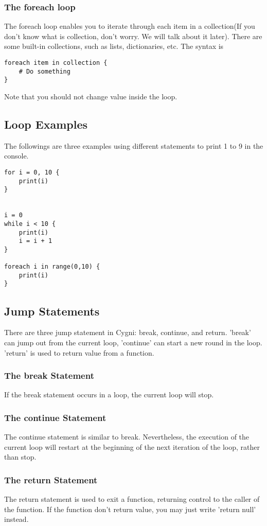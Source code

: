 \subsubsection{The foreach loop}
The foreach loop enables you to iterate through each item in a collection(If you don't know what is collection, don't worry. We will talk about it later). There are some built-in collections, such as lists, dictionaries, etc. The syntax is
\begin{lstlisting}
foreach item in collection {
	# Do something
}
\end{lstlisting}
Note that you should not change value inside the loop.

\subsection{Loop Examples}
The followings are three examples using different statements to print 1 to 9 in the console.
\begin{lstlisting}
for i = 0, 10 {
	print(i)
}


i = 0
while i < 10 {
	print(i)
	i = i + 1
}

foreach i in range(0,10) {
	print(i)
}
\end{lstlisting}


\subsection{Jump Statements}
There are three jump statement in Cygni: break, continue, and return. 'break' can jump out from the current loop, 'continue' can start a new round in the loop. 'return' is used to return value from a function.
\subsubsection{The break Statement}
If the break statement occurs in a loop, the current loop will stop.
\subsubsection{The continue Statement}
The continue statement is similar to break. Nevertheless, the execution of the current loop will restart at the beginning of the next iteration of the loop, rather than stop.
\subsubsection{The return Statement}
The return statement is used to exit a function, returning control to the caller of the function. If the function don't return value, you may just write 'return null' instead.

